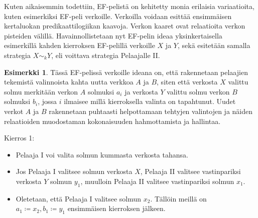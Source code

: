 \documentclass[finnish]{tktltiki2}
\theoremstyle{definition}
\newtheorem{esim}[lau]{Esimerkki}
\theoremstyle{remark}
\begin{document}
Kuten aikaisemmin todettiin, EF-pelistä on kehitetty monia erilaisia variaatioita, kuten esimerkiksi EF-peli verkoille. Verkoilla voidaan esittää ensimmäisen kertaluokan predikaattilogiikan kaavoja. Verkon kaaret ovat relaatioita verkon pisteiden välillä. Havainnollistetaan nyt EF-pelin ideaa yksinkertaisella esimerkillä kahden kierroksen EF-pelillä verkoille $X$ ja $Y$, sekä esitetään samalla strategia $X \sim_k Y$, eli voittava strategia Pelaajalle II.

\begin{esim}
Tässä EF-pelissä verkoille ideana on, että rakennetaan pelaajien tekemistä valinnoista kahta uutta verkkoa $A$ ja $B$, siten että verkosta $X$ valittu solmu merkitään verkon $A$ solmuksi $a_i$ ja verkosta $Y$ valittu solmu verkon $B$ solmuksi $b_i$, jossa $i$ ilmaisee millä kierroksella valinta on tapahtunut. Uudet verkot $A$ ja $B$ rakennetaan puhtaasti helpottamaan tehtyjen valintojen ja näiden relaatioiden muodostaman kokonaisuuden hahmottamista ja hallintaa.

\begin{center}
\end{center}


Kierros 1:
\begin{itemize}
  \item Pelaaja I voi valita solmun kummasta verkosta tahansa.
  \item Jos Pelaaja I valitsee solmun verkosta $X$, Pelaaja II valitsee vastinpariksi verkosta $Y$ solmun $y_1$, muulloin Pelaaja II valitsee vastinpariksi solmun $x_1$.
  \item Oletetaan, että Pelaaja I valitsee solmun $x_2$. Tällöin meillä on $a_1 \coloneqq x_2, b_1 \coloneqq y_1$ ensimmäisen kierroksen jälkeen.
\end{itemize}


\end{esim}
\end{document}
